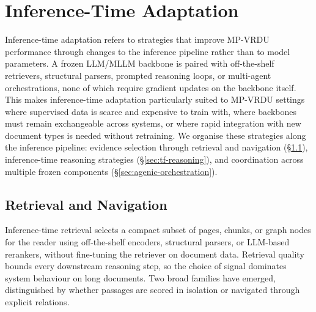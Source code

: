 \documentclass[11pt]{article}
\begin{document}
\section{Inference-Time Adaptation}
\label{sec:inference-time}
Inference-time adaptation refers to strategies that improve MP-VRDU performance through changes to the inference pipeline rather than to model parameters. A frozen LLM/MLLM backbone is paired with off-the-shelf retrievers, structural parsers, prompted reasoning loops, or multi-agent orchestrations, none of which require gradient updates on the backbone itself. This makes inference-time adaptation particularly suited to MP-VRDU settings where supervised data is scarce and expensive to train with, where backbones must remain exchangeable across systems, or where rapid integration with new document types is needed without retraining. We organise these strategies along the inference pipeline: evidence selection through retrieval and navigation (§\ref{sec:tf-retrieval}), inference-time reasoning strategies (§\ref{sec:tf-reasoning}), and coordination across multiple frozen components (§\ref{sec:agenic-orchestration}).


\subsection{Retrieval and Navigation}
\label{sec:tf-retrieval}
Inference-time retrieval selects a compact subset of pages, chunks, or graph nodes for the reader using off-the-shelf encoders, structural parsers, or LLM-based rerankers, without fine-tuning the retriever on document data. Retrieval quality bounds every downstream reasoning step, so the choice of signal dominates system behaviour on long documents. Two broad families have emerged, distinguished by whether passages are scored in isolation or navigated through explicit relations.
\end{document}
